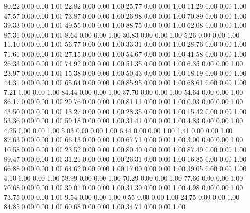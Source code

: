    80.22   0.00   0.00   1.00
   22.82   0.00   0.00   1.00
   25.77   0.00   0.00   1.00
   11.29   0.00   0.00   1.00
   47.57   0.00   0.00   1.00
   73.87   0.00   0.00   1.00
   26.98   0.00   0.00   1.00
   70.89   0.00   0.00   1.00
   39.33   0.00   0.00   1.00
   49.55   0.00   0.00   1.00
   88.75   0.00   0.00   1.00
   62.08   0.00   0.00   1.00
   87.31   0.00   0.00   1.00
    8.64   0.00   0.00   1.00
   80.83   0.00   0.00   1.00
    5.26   0.00   0.00   1.00
   11.10   0.00   0.00   1.00
   56.77   0.00   0.00   1.00
   33.31   0.00   0.00   1.00
   28.76   0.00   0.00   1.00
   71.61   0.00   0.00   1.00
   27.15   0.00   0.00   1.00
   54.67   0.00   0.00   1.00
   41.58   0.00   0.00   1.00
   26.33   0.00   0.00   1.00
   74.92   0.00   0.00   1.00
   51.35   0.00   0.00   1.00
    6.35   0.00   0.00   1.00
   23.97   0.00   0.00   1.00
   15.38   0.00   0.00   1.00
   50.43   0.00   0.00   1.00
   18.19   0.00   0.00   1.00
   44.31   0.00   0.00   1.00
   65.64   0.00   0.00   1.00
   85.95   0.00   0.00   1.00
   68.61   0.00   0.00   1.00
    7.21   0.00   0.00   1.00
   84.44   0.00   0.00   1.00
   87.70   0.00   0.00   1.00
   54.64   0.00   0.00   1.00
   86.17   0.00   0.00   1.00
   29.76   0.00   0.00   1.00
   81.11   0.00   0.00   1.00
    0.03   0.00   0.00   1.00
   43.50   0.00   0.00   1.00
   13.27   0.00   0.00   1.00
   28.35   0.00   0.00   1.00
   15.42   0.00   0.00   1.00
   53.36   0.00   0.00   1.00
   59.18   0.00   0.00   1.00
   31.41   0.00   0.00   1.00
    4.83   0.00   0.00   1.00
    4.25   0.00   0.00   1.00
    5.03   0.00   0.00   1.00
    6.44   0.00   0.00   1.00
    1.41   0.00   0.00   1.00
   87.63   0.00   0.00   1.00
   66.13   0.00   0.00   1.00
   67.71   0.00   0.00   1.00
    3.00   0.00   0.00   1.00
   10.58   0.00   0.00   1.00
   23.52   0.00   0.00   1.00
   80.40   0.00   0.00   1.00
   87.49   0.00   0.00   1.00
   89.47   0.00   0.00   1.00
   31.21   0.00   0.00   1.00
   26.31   0.00   0.00   1.00
   16.85   0.00   0.00   1.00
   66.88   0.00   0.00   1.00
   64.62   0.00   0.00   1.00
   17.00   0.00   0.00   1.00
   39.05   0.00   0.00   1.00
    4.10   0.00   0.00   1.00
   58.99   0.00   0.00   1.00
   70.29   0.00   0.00   1.00
   77.66   0.00   0.00   1.00
   70.68   0.00   0.00   1.00
   39.01   0.00   0.00   1.00
   31.30   0.00   0.00   1.00
    4.98   0.00   0.00   1.00
   73.75   0.00   0.00   1.00
    9.54   0.00   0.00   1.00
    0.55   0.00   0.00   1.00
   24.75   0.00   0.00   1.00
   84.85   0.00   0.00   1.00
   60.68   0.00   0.00   1.00
   34.71   0.00   0.00   1.00
